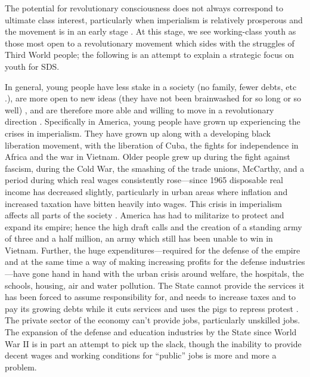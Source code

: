 \documentclass[12pt, titlepage]{article}
\begin{document}
{\begin{spacing}{1.10}
The potential for revolutionary consciousness does not always correspond to ultimate class interest, particularly when imperialism is relatively prosperous and the movement is in an early stage . At this stage, we see working-class youth as those most open to a revolutionary movement which sides with the struggles of Third World people; the following is an attempt to explain a strategic focus on youth for SDS.

In general, young people have less stake in a society (no family, fewer debts, etc .), are more open to new ideas (they have not been brainwashed for so long or so well) , and are therefore more able and willing to move in a revolutionary direction . Specifically in America, young people have grown up experiencing the crises in imperialism. They have grown up along with a developing black liberation movement, with the liberation of Cuba, the fights for independence in Africa and the war in Vietnam. Older people grew up during the fight against fascism, during the Cold War, the smashing of the trade unions, McCarthy, and a period during which real wages consistently rose—since 1965 disposable real income has decreased slightly, particularly in urban areas where inflation and increased taxation have bitten heavily into wages. This crisis in imperialism affects all parts of the society . America has had to militarize to protect and expand its empire; hence the high draft calls and the creation of a standing army of three and a half million, an army which still has been unable to win in Vietnam. Further, the huge expenditures—required for the defense of the empire and at the same time a way of making increasing profits for the defense industries—have gone hand in hand with the urban crisis around welfare, the hospitals, the schools, housing, air and water pollution. The State cannot provide the services it has been forced to assume responsibility for, and needs to increase taxes and to pay its growing debts while it cuts services and uses the pigs to repress protest . The private sector of the economy can't provide jobs, particularly unskilled jobs. The expansion of the defense and education industries by the State since World War II is in part an attempt to pick up the slack, though the inability to provide decent wages and working conditions for ``public'' jobs is more and more a problem.


\end{spacing}}
\end{document}
